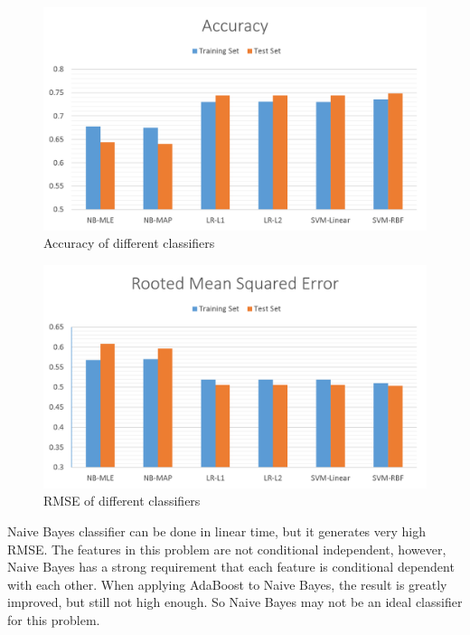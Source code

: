 \documentclass{article} %
\begin{document}
\begin{figure}[H]
\begin{center}
\includegraphics[scale=0.4]{Accuracy.png}
\end{center}
\caption{Accuracy of different classifiers}
\end{figure}


\begin{figure}[H]
\begin{center}
\includegraphics[scale=0.4]{RMSE.png}
\end{center}
\caption{RMSE of different classifiers}
\end{figure}


 
Naive Bayes classifier can be done in linear time, but it generates very high RMSE. The features in this problem are not conditional independent, however, Naive Bayes has a strong requirement that each feature is conditional dependent with each other. When applying AdaBoost to Naive Bayes, the result is greatly improved, but still not high enough. So Naive Bayes may not be an ideal classifier for this problem.
\end{document}
